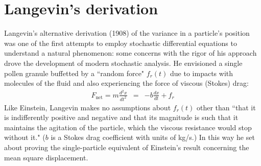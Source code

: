 \documentclass{article}
\begin{document}
\section*{Langevin's derivation}
Langevin's alternative derivation (1908) of the variance in a particle's position was one of the first attempts to employ stochastic differential equations to understand a natural phenomenon: some concerns with the rigor of his approach drove the development of modern stochastic analysis. He envisioned a single pollen granule buffetted by a ``random force" $f_r(t)$ due to impacts with molecules of the fluid and also experiencing the force of viscous (Stokes) drag:
\begin{eqnarray}
 F_{\textrm{net}} = m \frac{d^2x}{dt^2} & = & - b \frac{dx}{dt} + f_r \label{eqn:start}
 \end{eqnarray}
Like Einstein, Langevin makes no assumptions about $f_r(t)$ other than ``that it is indifferently positive and negative and that its magnitude is such that it maintains the agitation of the particle, which the viscous resistance would stop without it." ($b$ is a Stokes drag coefficient with units of kg/s.) In this way he set about proving the single-particle equivalent of Einstein's result concerning the mean square displacement.\\
\end{document}
